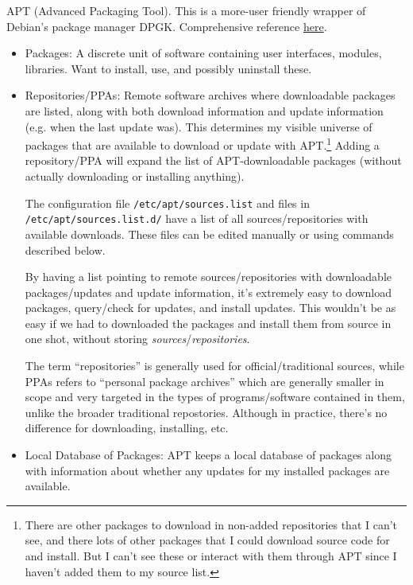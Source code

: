 \documentclass[12pt]{article}
\theoremstyle{plain}
\theoremstyle{definition}
\theoremstyle{remark}
\begin{document}
APT (Advanced Packaging Tool).
This is a more-user friendly wrapper of Debian's package manager DPGK.
Comprehensive reference
\href{https://www.digitalocean.com/community/tutorials/ubuntu-and-debian-package-management-essentials}{here}.
\begin{itemize}
  \item Packages: A discrete unit of software containing user
    interfaces, modules, libraries.
    Want to install, use, and possibly uninstall these.

  \item Repositories/PPAs:
    Remote software archives where downloadable packages are listed,
    along with both download information and update information (e.g.
    when the last update was).
    This determines my visible universe of packages that are available
    to download or update with APT.\footnote{%
      There are other packages to download in non-added repositories
      that I can't see, and there lots of other packages that I could
      download source code for and install. But I can't see these or
      interact with them through APT since I haven't added them to my
      source list.
    }
    Adding a repository/PPA will expand the list of APT-downloadable
    packages (without actually downloading or installing anything).

    The configuration file \texttt{/etc/apt/sources.list}
    and files in \texttt{/etc/apt/sources.list.d/}
    have a list of all sources/repositories with available downloads.
    These files can be edited manually or using commands described
    below.

    By having a list pointing to remote sources/repositories with
    downloadable packages/updates and update information,
    it's extremely easy to download packages, query/check for updates,
    and install updates.
    This wouldn't be as easy if we had to downloaded the packages and
    install them from source in one shot, without storing
    \emph{sources}/\emph{repositories}.

    The term ``repositories'' is generally used for official/traditional
    sources, while PPAs refers to ``personal package archives'' which
    are generally smaller in scope and very targeted in the types of
    programs/software contained in them, unlike the broader traditional
    repostories.
    Although in practice, there's no difference for downloading,
    installing, etc.

  \item Local Database of Packages:
    APT keeps a local database of packages along with information about
    whether any updates for my installed packages are available.


\end{itemize}
\end{document}
